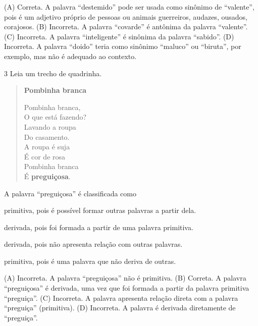 \begin{boxlist}
(A) Correta. A palavra ``destemido'' pode ser usada como sinônimo de
``valente'', pois é um adjetivo próprio de pessoas ou animais
guerreiros, audazes, ousados, corajosos.
(B) Incorreta. A palavra ``covarde'' é antônima da palavra ``valente''.
(C) Incorreta. A palavra ``inteligente'' é sinônima da palavra
``sabido''.
(D) Incorreta. A palavra ``doido'' teria como sinônimo ``maluco'' ou
``biruta'', por exemplo, mas não é adequado ao contexto.

\num{3} Leia um trecho de quadrinha.

\begin{verse}
\textbf{Pombinha branca}

Pombinha branca,\\
O que está fazendo?\\
Lavando a roupa\\
Do casamento.\\
A roupa é suja\\
É cor de rosa\\
Pombinha branca\\
É \textbf{preguiçosa}.

\end{verse}

A palavra ``preguiçosa'' é classificada como

\begin{escolha}
\item primitiva, pois é possível formar outras palavras a partir dela.

\item derivada, pois foi formada a partir de uma palavra primitiva.

\item derivada, pois não apresenta relação com outras palavras.

\item primitiva, pois é uma palavra que não deriva de outras.
\end{escolha}


(A) Incorreta. A palavra ``preguiçosa'' não é primitiva.
(B) Correta. A palavra ``preguiçosa'' é derivada, uma vez que foi
formada a partir da palavra primitiva ``preguiça''.
(C) Incorreta. A palavra apresenta relação direta com a palavra
``preguiça'' (primitiva).
(D) Incorreta. A palavra é derivada diretamente de ``preguiça''.


\end{boxlist}
